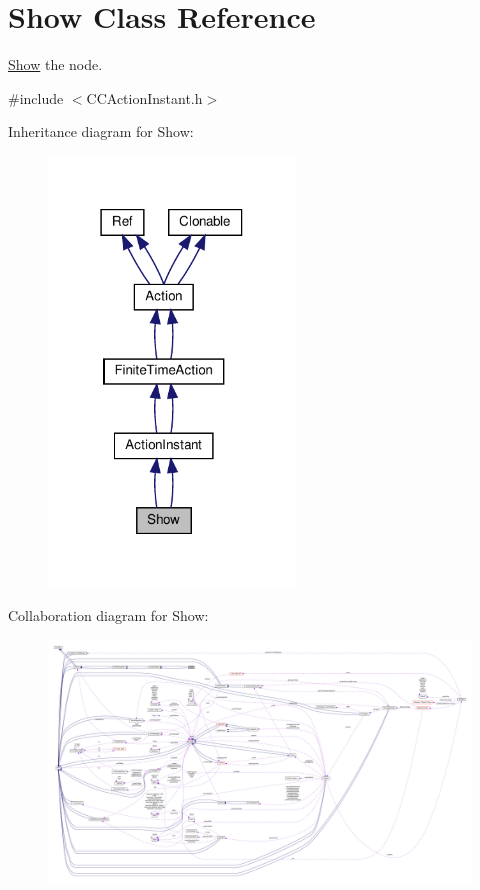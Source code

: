 \hypertarget{classShow}{}\section{Show Class Reference}
\label{classShow}


\hyperlink{classShow}{Show} the node.  




{\ttfamily \#include $<$C\+C\+Action\+Instant.\+h$>$}



Inheritance diagram for Show\+:
\nopagebreak
\begin{figure}[H]
\begin{center}
\leavevmode
\includegraphics[width=186pt]{classShow__inherit__graph}
\end{center}
\end{figure}


Collaboration diagram for Show\+:
\nopagebreak
\begin{figure}[H]
\begin{center}
\leavevmode
\includegraphics[width=350pt]{classShow__coll__graph}
\end{center}
\end{figure}
